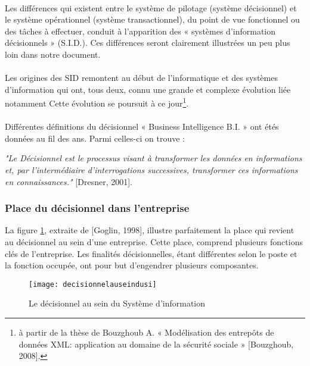 \paragraph{}
Les différences qui existent entre le système de pilotage (système décisionnel) et le système opérationnel (système transactionnel), du point de vue fonctionnel ou des tâches à effectuer, conduit à l’apparition des « systèmes d’information décisionnels » (S.I.D.). Ces différences seront clairement illustrées un peu plus loin dans notre document.
\paragraph{}

Les origines des SID remontent au début de l’informatique et des systèmes d’information
qui ont, tous deux, connu une grande et complexe évolution liée notamment Cette évolution se poursuit à ce jour\footnote{à partir de la thèse de Bouzghoub A. « Modélisation des entrepôts de données XML: application au domaine de la sécurité sociale » [Bouzghoub, 2008].}.
\paragraph{}
Différentes définitions du décisionnel « Business Intelligence B.I. » ont étés données au fil des ans. Parmi celles-ci on trouve : 

\textit{"Le Décisionnel est le processus visant à transformer les données en informations et,
par l'intermédiaire d'interrogations successives, transformer ces informations en
connaissances."} [Dresner, 2001].

\subsubsection{Place du décisionnel dans l’entreprise}
La figure \ref{fig:decisionnelauseindusi}, extraite de [Goglin, 1998], illustre parfaitement la place qui revient au décisionnel au sein d’une entreprise. Cette place, comprend plusieurs fonctions clés de l’entreprise. Les finalités décisionnelles, étant différentes selon le poste et la fonction occupée, ont pour but d’engendrer plusieurs composantes.

\begin{figure}[H]
    \centering
    \texttt{[image: decisionnelauseindusi]}
    \caption{Le décisionnel au sein du Système d’information}
    \label{fig:decisionnelauseindusi}
\end{figure}

